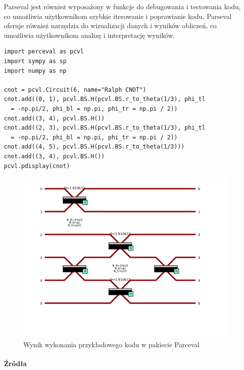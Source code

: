 \documentclass[a4paper,12pt
]{article}
\begin{document}
Parseval jest również wyposażony w funkcje do debugowania i testowania
kodu, co umożliwia użytkownikom szybkie iterowanie i poprawianie kodu.
Parseval oferuje również narzędzia do wizualizacji danych i wyników
obliczeń, co umożliwia użytkownikom analizę i interpretację wyników.

\begin{lstlisting}
import perceval as pcvl
import sympy as sp
import numpy as np

cnot = pcvl.Circuit(6, name="Ralph CNOT")
cnot.add((0, 1), pcvl.BS.H(pcvl.BS.r_to_theta(1/3), phi_tl 
  = -np.pi/2, phi_bl = np.pi, phi_tr = np.pi / 2))
cnot.add((3, 4), pcvl.BS.H())
cnot.add((2, 3), pcvl.BS.H(pcvl.BS.r_to_theta(1/3), phi_tl 
  = -np.pi/2, phi_bl = np.pi, phi_tr = np.pi / 2))
cnot.add((4, 5), pcvl.BS.H(pcvl.BS.r_to_theta(1/3)))
cnot.add((3, 4), pcvl.BS.H())
pcvl.pdisplay(cnot)
\end{lstlisting}

\begin{figure}
\centering
\includegraphics{parceval-example-cnot.png}
\caption{Wynik wykonania przykładowego kodu w pakiecie Parceval}
\end{figure}

\hypertarget{ux17aruxf3dux142a}{%
\paragraph{Źródła}\label{ux17aruxf3dux142a}}
\end{document}
